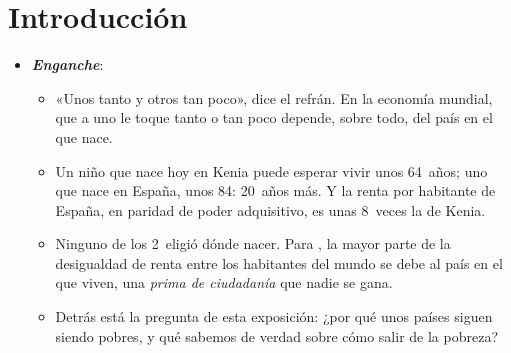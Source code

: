 \documentclass[11pt]{article}
\begin{document}
\tceetitulo

\section*{Introducción}

\begin{itemize}
\item \textbf{\emph{Enganche}}:
  \begin{itemize}
  \item «Unos tanto y otros tan poco», dice el refrán. En la economía mundial, que a uno le toque tanto o tan poco depende, sobre todo, del país en el que nace.
  \item Un niño que nace hoy en Kenia puede esperar vivir unos 64~años; uno que nace en España, unos 84: 20~años más. Y la renta por habitante de España, en paridad de poder adquisitivo, es unas 8~veces la de Kenia\nocite{PNUD2025IDH}.
  \item Ninguno de los 2~eligió dónde nacer. Para \textcite{Milanovic2016}, la mayor parte de la desigualdad de renta entre los habitantes del mundo se debe al país en el que viven, una \emph{prima de ciudadanía} que nadie se gana.
  \item Detrás está la pregunta de esta exposición: ¿por qué unos países siguen siendo pobres, y qué sabemos de verdad sobre cómo salir de la pobreza?
  \end{itemize}


\end{itemize}
\end{document}
